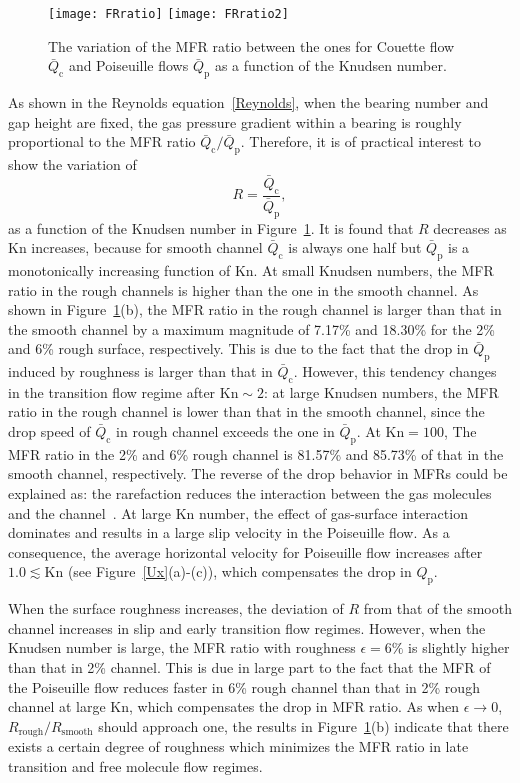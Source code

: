 \begin{figure}[t]
	\centering
	\texttt{[image: FRratio]}
	\texttt{[image: FRratio2]}
	\caption{The variation of the MFR ratio between the ones for Couette flow $\bar{Q}_\text{c}$ and Poiseuille flows $\bar{Q}_\text{p}$ as a function of the Knudsen number.}
	\label{FRratio}
\end{figure}


As shown in the Reynolds equation~\eqref{Reynolds}, when the bearing number and gap height are fixed, the gas pressure gradient within a bearing is roughly proportional to the MFR ratio $\bar{Q}_\text{c}/\bar{Q}_\text{p}$. Therefore, it is of practical interest to show the variation of
\begin{equation}\label{MFR_ratio}
R=\frac{\bar{Q}_\text{c}}{\bar{Q}_\text{p}},
\end{equation}
as a function of the Knudsen number in Figure~\ref{FRratio}. It is found that $R$ decreases as $\text{Kn}$ increases, because for smooth channel $\bar{Q}_\text{c}$ is always one half but $\bar{Q}_\text{p}$ is a monotonically increasing function of $\text{Kn}$. At small Knudsen numbers, the MFR ratio in the rough channels is higher than the one in the smooth channel. As shown in Figure~\ref{FRratio}(b), the MFR ratio in the rough channel is larger than that in the smooth channel by a maximum magnitude of 7.17\% and 18.30\% for the 2\% and 6\% rough surface, respectively. This is due to the fact that the drop in $\bar{Q}_\text{p}$ induced by roughness is larger than that in $\bar{Q}_\text{c}$. However, this tendency changes in the transition flow regime after $\text{Kn}\sim2$: at large Knudsen numbers, the MFR ratio in the rough channel is lower than that in the smooth channel, since the drop speed of $\bar{Q}_\text{c}$ in rough channel exceeds the one in $\bar{Q}_\text{p}$. At $\text{Kn}=100$, The MFR ratio in the 2\% and 6\% rough channel is 81.57\% and 85.73\% of that in the smooth channel, respectively. The reverse of the drop behavior in MFRs could be explained as: the rarefaction reduces the interaction between the gas molecules and the channel~\cite{Sun2003rough}. At large Kn number, the effect of gas-surface interaction dominates and results in a large slip velocity in the Poiseuille flow. As a consequence, the average horizontal velocity for Poiseuille flow increases after $1.0\lesssim\text{Kn}$ (see Figure~\ref{Ux}(a)-(c)), which compensates the drop in $Q_\text{p}$. 


When the surface roughness increases, the deviation of $R$ from that of the smooth channel increases in  slip and early transition flow regimes. However, when the Knudsen number is large, the MFR ratio with roughness $\epsilon=6\%$ is slightly higher than that in 2\% channel. This is due in large part to the fact that the MFR of the Poiseuille flow reduces faster in 6\% rough channel than that in 2\% rough channel  at large Kn, which compensates the drop in MFR ratio. As when $\epsilon\rightarrow0$, $R_{\text{rough}}/R_{\text{smooth}}$ should approach one, the results in Figure~\ref{FRratio}(b) indicate that there exists a certain degree of roughness which minimizes the MFR ratio in late transition and free molecule flow regimes.



